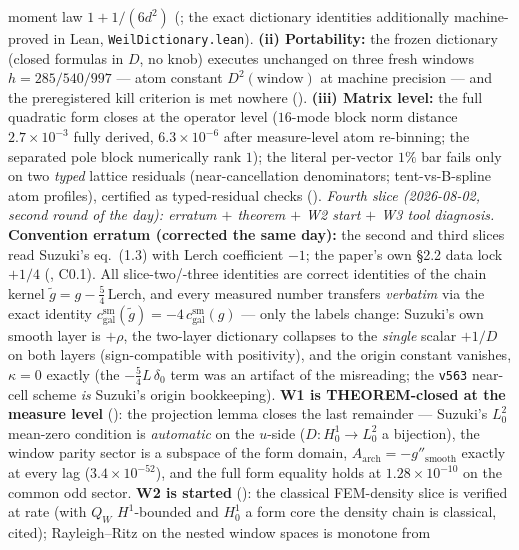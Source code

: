 moment law $1+1/(6d^2)$ (; the exact
dictionary identities additionally machine-proved in Lean,
\texttt{WeilDictionary.lean}).  \textbf{(ii) Portability:} the frozen
dictionary (closed formulas in $D$, no knob) executes unchanged on
three fresh windows $h=285/540/997$ --- atom constant
$D^2(\text{window})$ at machine precision --- and the preregistered
kill criterion is met nowhere ().
\textbf{(iii) Matrix level:} the full quadratic form closes at the
operator level ($16$-mode block norm distance $2.7\times10^{-3}$ fully
derived, $6.3\times10^{-6}$ after measure-level atom re-binning; the
separated pole block numerically rank $1$); the literal per-vector
$1\%$ bar fails only on two \emph{typed} lattice residuals
(near-cancellation denominators; tent-vs-B-spline atom profiles),
certified as typed-residual checks ().
\emph{Fourth slice (2026-08-02, second round of the day):
erratum $+$ theorem $+$ W2 start $+$ W3 tool diagnosis.}
\textbf{Convention erratum (corrected the same day):} the second and
third slices read Suzuki's eq.~(1.3) with Lerch coefficient $-1$; the
paper's own \S2.2 data lock $+1/4$ (,
C0.1).  All slice-two/-three identities are correct identities of the
chain kernel $\tilde g=g-\tfrac54\,$Lerch, and every measured number
transfers \emph{verbatim} via the exact identity
$c^{\mathrm{sm}}_{\mathrm{gal}}(\tilde g)=-4\,c^{\mathrm{sm}}_{\mathrm{gal}}(g)$
--- only the labels change: Suzuki's own smooth layer is $+\rho$, the
two-layer dictionary collapses to the \emph{single} scalar $+1/D$ on
both layers (sign-compatible with positivity), and the origin constant
vanishes, $\kappa=0$ exactly (the $-\tfrac54 L\,\delta_0$ term was an
artifact of the misreading; the \texttt{v563} near-cell scheme
\emph{is} Suzuki's origin bookkeeping).  \textbf{W1 is
THEOREM-closed at the measure level} ():
the projection lemma closes the last remainder --- Suzuki's $L^2_0$
mean-zero condition is \emph{automatic} on the $u$-side
($D:H^1_0\to L^2_0$ a bijection), the window parity sector is a
subspace of the form domain, $A_{\mathrm{arch}}=-g''_{\mathrm{smooth}}$
exactly at every lag ($3.4\times10^{-52}$), and the full form equality
holds at $1.28\times10^{-10}$ on the common odd sector.
\textbf{W2 is started} (): the
classical FEM-density slice is verified at rate (with $Q_W$
$H^1$-bounded and $H^1_0$ a form core the density chain is classical,
cited); Rayleigh--Ritz on the nested window spaces is monotone from

